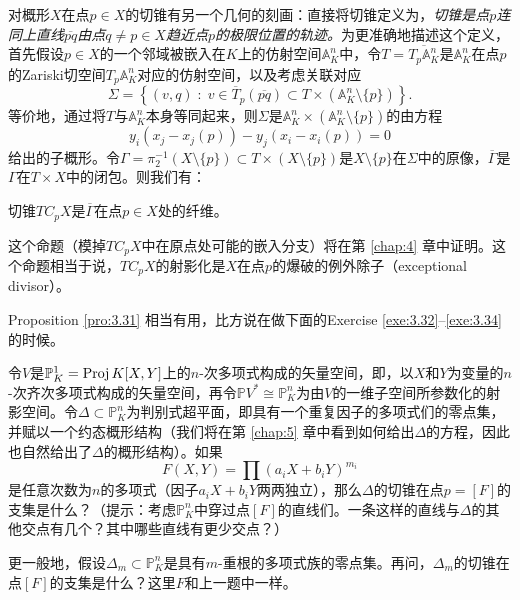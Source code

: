 对概形$X$在点$p\in X$的切锥有另一个几何的刻画：直接将切锥定义为，\textit{切锥是点$p$连同上直线$\overline{pq}$由点$q\neq p\in X$趋近点$p$的极限位置的轨迹。}为更准确地描述这个定义，首先假设$p\in X$的一个邻域被嵌入在$K$上的仿射空间$\mathbb A_K^n$中，令$T=\overline{T_p\mathbb A_K^n}$是$\mathbb A_K^n$在点$p$的Zariski切空间$T_p\mathbb A_K^n$对应的仿射空间，以及考虑关联对应
\[
	\Sigma = \left\{(v,q)\;:\;v\in \overline{T}_p(\overline{pq})\subset T\times (\mathbb A_K^n \setminus \{p\})\right\}.
\] %
等价地，通过将$T$与$\mathbb A_K^n$本身等同起来，则$\Sigma$是$\mathbb A_K^n\times (\mathbb A_K^n \setminus \{p\})$的由方程
\[
	y_i\left(x_j-x_j(p)\right)-y_j\left(x_i-x_i(p)\right)=0
\]
给出的子概形。令$\Gamma=\pi_2^{-1}(X\setminus \{p\})\subset T\times (X\setminus \{p\})$是$X\setminus \{p\}$在$\Sigma$中的原像，$\overline{\Gamma}$是$\Gamma$在$T\times X$中的闭包。则我们有：

\begin{pro}\label{pro:3.31}
切锥$TC_p X$是$\overline{\Gamma}$在点$p\in X$处的纤维。
\end{pro}

这个命题（模掉$TC_p X$中在原点处可能的嵌入分支）将在第 \ref{chap:4} 章中证明。这个命题相当于说，$TC_p X$的射影化是$X$在点$p$的爆破的例外除子（exceptional divisor）。

Proposition \ref{pro:3.31} 相当有用，比方说在做下面的Exercise \ref{exe:3.32}--\ref{exe:3.34} 的时候。

\begin{exe}\label{exe:3.32}
令$V$是$\mathbb P_K^1=\operatorname{Proj} K[X,Y]$上的$n$-次多项式构成的矢量空间，即，以$X$和$Y$为变量的$n$-次齐次多项式构成的矢量空间，再令$\mathbb P V^*\cong \mathbb P_K^n$为由$V$的一维子空间所参数化的射影空间。令$\Delta\subset \mathbb P_K^n$为判别式超平面，即具有一个重复因子的多项式们的零点集，并赋以一个约态概形结构（我们将在第 \ref{chap:5} 章中看到如何给出$\Delta$的方程，因此也自然给出了$\Delta$的概形结构）。如果
\[
	F(X,Y)=\prod (a_i X+b_i Y)^{m_i}
\]
是任意次数为$n$的多项式（因子$a_iX+b_iY$两两独立），那么$\Delta$的切锥在点$p=[F]$的支集是什么？（提示：考虑$\mathbb P_K^n$中穿过点$[F]$的直线们。一条这样的直线与$\Delta$的其他交点有几个？其中哪些直线有更少交点？）
\end{exe}

\begin{exe}\label{exe:3.33}
更一般地，假设$\Delta_m\subset \mathbb P_K^n$是具有$m$-重根的多项式族的零点集。再问，$\Delta_m$的切锥在点$[F]$的支集是什么？这里$F$和上一题中一样。
\end{exe}

